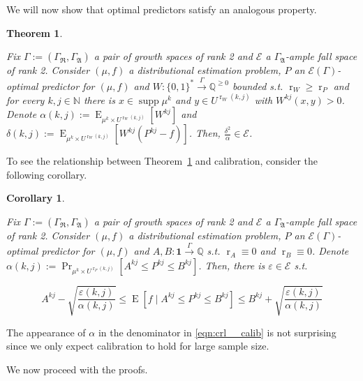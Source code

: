 \documentclass{article}
\numberwithin{equation}{section}
\theoremstyle{definition}
\theoremstyle{plain}
\newtheorem{theorem}{Theorem}[section]
\newtheorem{corollary}{Corollary}[section]
\newcommand{\Words}{{\{ 0, 1 \}^*}}
\DeclareMathOperator{\Supp}{supp}
\DeclareMathOperator{\Prb}{Pr}
\DeclareMathOperator{\E}{E}
\DeclareMathOperator{\R}{r}
\newcommand{\Nats}{\mathbb{N}}
\newcommand{\Rats}{\mathbb{Q}}
\begin{document}
We will now show that optimal predictors satisfy an analogous property.

\begin{theorem}
\label{thm:calib}

Fix $\Gamma:=(\Gamma_{\mathfrak{R}},\Gamma_{\mathfrak{A}})$ a pair of growth spaces of rank 2 and $\mathcal{E}$ a $\Gamma_{\mathfrak{A}}$-ample fall space of rank 2. Consider $(\mu,f)$ a distributional estimation problem, $P$ an $\mathcal{E}(\Gamma)$-optimal predictor for $(\mu,f)$ and ${W: \Words \xrightarrow{\Gamma} \Rats^{\geq 0}}$ bounded s.t. $\R_W \geq \R_P$ and for every $k,j \in \Nats$ there is $x \in \Supp \mu^k$ and $y \in U^{\R_W(k,j)}$ with $W^{kj}(x,y) > 0$. Denote ${\alpha(k,j):=\E_{\mu^k \times U^{\R_W(k,j)}}[W^{kj}]}$ and ${\delta(k,j):=\E_{\mu^k \times U^{\R_W(k,j)}}[W^{kj}(P^{kj}-f)]}$. Then, $\frac{\delta^2}{\alpha} \in \mathcal{E}$.

\end{theorem}

To see the relationship between Theorem~\ref{thm:calib} and calibration, consider the following corollary.

\begin{corollary}
\label{crl:calib}

Fix $\Gamma:=(\Gamma_{\mathfrak{R}},\Gamma_{\mathfrak{A}})$ a pair of growth spaces of rank 2 and $\mathcal{E}$ a $\Gamma_{\mathfrak{A}}$-ample fall space of rank 2. Consider $(\mu,f)$ a distributional estimation problem, $P$ an $\mathcal{E}(\Gamma)$-optimal predictor for $(\mu,f)$ and $A,B: \bm{1} \xrightarrow{\Gamma} \Rats$ s.t. $\R_A \equiv 0$ and $\R_B \equiv 0$. Denote ${\alpha(k,j):=\Prb_{\mu^k \times U^{\R_P(k,j)}}[A^{kj} \leq P^{kj} \leq B^{kj}]}$. Then, there is $\varepsilon \in \mathcal{E}$ s.t. 

\begin{equation}
\label{eqn:crl__calib}
A^{kj} - \sqrt{\frac{\varepsilon(k,j)}{\alpha(k,j)}} \leq \E[f \mid A^{kj} \leq P^{kj} \leq B^{kj}] \leq B^{kj} + \sqrt{\frac{\varepsilon(k,j)}{\alpha(k,j)}}
\end{equation}

\end{corollary}

The appearance of $\alpha$ in the denominator in \ref{eqn:crl__calib} is not surprising since we only expect calibration to hold for large sample size.

We now proceed with the proofs.
\end{document}
